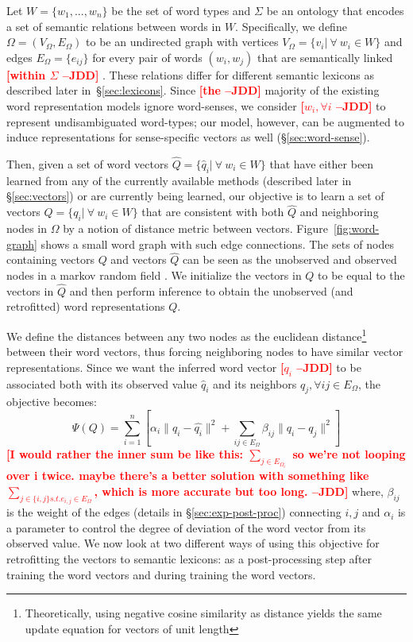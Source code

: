 \documentclass[11pt]{article}
\newcommand{\jdd}[1]{\textcolor{red}{\bf\small [#1 --JDD]}}
\begin{document}
Let $W = \{w_1,...,w_n\}$ be the set of word types and $\Sigma$ be an ontology that encodes a set of semantic relations between words in $W$. 
Specifically, we define $\Omega = (V_\Omega,E_\Omega)$ to be an undirected graph with vertices $V_\Omega = \{v_i | \  \forall \  w_i \in W\}$ and 
edges $E_\Omega = \{e_{ij}\}$ for every pair of words $(w_i,w_j)$ that are semantically linked \jdd{within $\Sigma$ } . These relations differ for different semantic lexicons as described later in~\S\ref{sec:lexicons}.
Since \jdd{the} majority of the existing word representation models ignore word-senses,
we consider  \jdd{$ w_i,\forall i$} to represent undisambiguated word-types; our model, however,
can be augmented to induce representations for sense-specific vectors as well (\S\ref{sec:word-sense}).

Then, given a set of word vectors $\hat{Q} = \{\hat{q}_i | \  \forall \  w_i \in W\}$ that have 
either been learned from any of the currently available
methods (described later in \S\ref{sec:vectors}) or are currently being learned, 
our objective is to learn a set of vectors $Q = \{q_i | \  \forall \  w_i \in W\}$ that are 
consistent with both $\hat{Q}$ and neighboring nodes in $\Omega$ by a notion of 
distance metric between vectors. 
Figure~\ref{fig:word-graph} shows a small word graph with such edge 
connections. The sets of nodes containing vectors $Q$ and vectors $\hat{Q}$ 
can be seen as the unobserved and observed nodes in a markov random field 
\cite{kindermann80mrf}. We initialize the vectors in $Q$ to be equal to the vectors in $\hat{Q}$
and then perform inference to obtain the unobserved (and retrofitted) word representations $Q$.

We define the distances between any two nodes as the euclidean distance\footnote{Theoretically, using negative cosine similarity as distance yields the same update equation for vectors of unit length}
 between their word vectors, thus forcing 
neighboring nodes to have similar vector representations. Since we want the inferred word vector \jdd{$q_i$} to be
associated both with its observed value $\hat{q}_i$ and its neighbors 
$q_j, \forall ij \in E_{\Omega}$, the objective becomes:
\begin{equation}
  \label{equ:eucl}
  \displaystyle \Psi(Q) = \sum_{i=1}^n \left[ \alpha_i \lVert q_i - \hat{q_i} \rVert^2 + \sum_{ij \in E_{\Omega}} \beta_{ij} \lVert q_i - q_j \rVert^2 \right]
\end{equation}
\jdd{I would rather the inner sum be like this: $\sum\limits_{j\in E_{\Omega_i}}$ so we're not looping over i twice. maybe there's a better solution with something like $\sum\limits_{j\in\{i,j\} s.t. e_{i,j}\in E_\Omega}$, which is more accurate but too long.}
where, $\beta_{ij}$ is the weight of the edges (details in \S\ref{sec:exp-post-proc}) 
connecting $i,j$ and $\alpha_i$ is a parameter to control the degree of deviation of the word 
vector from its observed value. We now look at two different ways of 
using this objective for retrofitting the vectors to semantic lexicons:
as a post-processing step after training the word vectors and during training the word vectors.
\end{document}
